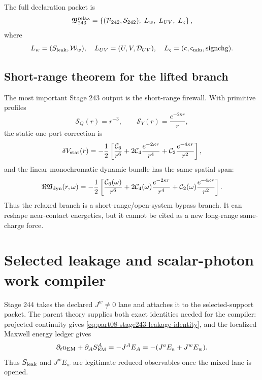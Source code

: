 The full declaration packet is
\begin{equation}
\label{eq:part08-stage243-relaxed-branch}
\mathfrak B_{243}^{\rm relax}
=
\left\{(\mathcal P_{242},\mathcal S_{242});\;L_w,\;L_{UV},\;L_\varsigma\right\},
\end{equation}
where
\begin{equation}
\label{eq:part08-stage243-lanes}
L_w=(S_{\rm leak},\mathcal W_w),
\quad
L_{UV}=(U,V,\mathcal D_{UV}),
\quad
L_\varsigma=(\varsigma,\varsigma_{\min},\mathrm{signchg}).
\end{equation}

\subsection{Short-range theorem for the lifted branch}
\label{subsec:part08-short-range-theorem}

The most important Stage 243 output is the short-range firewall.  With primitive profiles
\begin{equation}
\label{eq:part08-stage243-source-profiles}
\mathcal S_Q(r)=r^{-3},
\qquad
\mathcal S_Y(r)=\frac{e^{-2\kappa r}}{r},
\end{equation}
the static one-port correction is
\begin{equation}
\label{eq:part08-stage243-static-correction}
\delta V_{\rm stat}(r)
=
-\frac12\left[
\frac{\mathcal C_6}{r^6}
+2\mathcal C_4\frac{e^{-2\kappa r}}{r^4}
+\mathcal C_2\frac{e^{-4\kappa r}}{r^2}
\right],
\end{equation}
and the linear monochromatic dynamic bundle has the same spatial span:
\begin{equation}
\label{eq:part08-stage243-dynamic-correction}
\Re\mathfrak V_{\rm dyn}(r,\omega)
=
-\frac12\left[
\frac{\mathcal C_6(\omega)}{r^6}
+2\mathcal C_4(\omega)\frac{e^{-2\kappa r}}{r^4}
+\mathcal C_2(\omega)\frac{e^{-4\kappa r}}{r^2}
\right].
\end{equation}
Thus the relaxed branch is a short-range/open-system bypass branch.  It can reshape near-contact energetics, but it cannot be cited as a new long-range same-charge force.

\section{Selected leakage and scalar-photon work compiler}
\label{sec:part08_relaxed_branch:selected-leakage-and-scalar-photon-work-compiler}

Stage 244 takes the declared \(J^w\neq0\) lane and attaches it to the selected-support packet.  The parent theory supplies both exact identities needed for the compiler: projected continuity gives \cref{eq:part08-stage243-leakage-identity}, and the localized Maxwell energy ledger gives
\begin{equation}
\label{eq:part08-stage244-em-energy}
\partial_tu_{\rm EM}+\partial_AS_{\rm EM}^{A}
=
-J^AE_A
=-(J^aE_a+J^wE_w).
\end{equation}
Thus \(S_{\rm leak}\) and \(J^wE_w\) are legitimate reduced observables once the mixed lane is opened.

